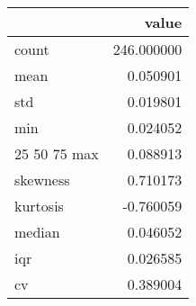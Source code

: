 \begin{tabular}{lr}
\toprule
 & value \\
\midrule
count & 246.000000 \\
mean & 0.050901 \\
std & 0.019801 \\
min & 0.024052 \\
25%
50%
75%
max & 0.088913 \\
skewness & 0.710173 \\
kurtosis & -0.760059 \\
median & 0.046052 \\
iqr & 0.026585 \\
cv & 0.389004 \\
\bottomrule
\end{tabular}
